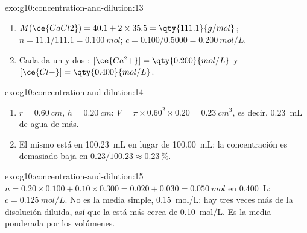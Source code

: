 \begin{solution}{exo:g10:concentration-and-dilution:13}
\begin{enumerate}
  \item $M(\ce{CaCl2}) = 40.1 + 2 \times 35.5 = \qty{111.1}{g/mol}$;
        $n = 11.1 / 111.1 = \qty{0.100}{mol}$; $c = 0.100 / 0.5000 =
        \qty{0.200}{mol/L}$.
  \item Cada  da un  y dos :
        $[\ce{Ca^2+}] = \qty{0.200}{mol/L}$ y $[\ce{Cl-}] =
        \qty{0.400}{mol/L}$.
\end{enumerate}
\end{solution}

\begin{solution}{exo:g10:concentration-and-dilution:14}
\begin{enumerate}
  \item $r = \qty{0.60}{cm}$, $h = \qty{0.20}{cm}$:
        $V = \pi \times 0.60^2 \times 0.20 = \qty{0.23}{cm^3}$, es
        decir, \qty{0.23}{mL} de agua de más.
  \item El mismo  está en \qty{100.23}{mL} en lugar de
        \qty{100.00}{mL}: la concentración es demasiado baja en
        $0.23 / 100.23 \approx
        \qty{0.23}{\percent}$.
\end{enumerate}
\end{solution}

\begin{solution}{exo:g10:concentration-and-dilution:15}
$n = 0.20 \times 0.100 + 0.10 \times 0.300 = 0.020 + 0.030 =
\qty{0.050}{mol}$ en \qty{0.400}{L}: $c = \qty{0.125}{mol/L}$. No es la
media simple, \qty{0.15}{mol/L}: hay tres veces más de la disolución
diluida, así que la  está más cerca de \qty{0.10}{mol/L}. Es la
media ponderada por los volúmenes.
\end{solution}

